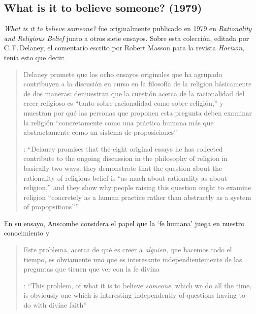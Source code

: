 \subsection{What is it to believe someone? (1979)}

\emph{What is it to believe someone?} fue originalmente publicado en 1979 en \emph{Rationality and Religious Belief} junto a otros siete ensayos. Sobre esta colección, editada por C.\,F.\,Delaney, el comentario escrito por Robert Masson para la revista \emph{Horizon}, tenía esto que decir: \blockquote[{\cite[440]{masson1981}}: \enquote{Delaney promises that the eight original essays he has collected \textelp{} contribute to the ongoing discussion in the philosophy of religion in basically two ways: they demonstrate that the question about the rationality of religious belief is ``as much about rationality as about religion,'' and they show why people raising this question ought to examine religion ``concretely as a human practice rather than abstractly as a system of propopsitions''}]{Delaney promete que los ocho ensayos originales que ha agrupado \textelp{} contribuyen a la discusión en curso en la filosofía de la religion básicamente de dos maneras: demuestran que la cuestión acerca de la racionalidad del creer religioso es ``tanto sobre racionalidad como sobre religión,'' y muestran por qué las personas que proponen esta pregunta deben examinar la religión ``concretamente como una práctica humana más que abstractamente como un sistema de proposiciones''}. En su ensayo, Anscombe considera el papel que la `fe humana' juega en nuestro conocimiento y \blockquote[{\cite[xvii]{anscombe2008faith}}: \enquote{This problem, of what it is to believe \emph{someone}, which we do all the time, is obviously one which is interesting independently of questions having to do with divine faith}]{Este problema, acerca de qué es creer a \emph{alguien}, que hacemos todo el tiempo, es obviamente uno que es interesante independientemente de las preguntas que tienen que ver con la fe divina}.

